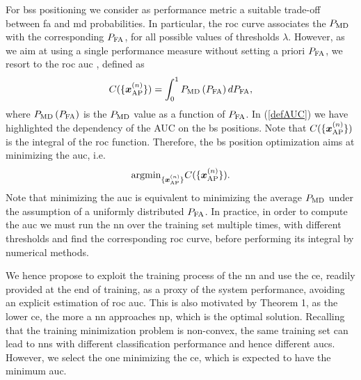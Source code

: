 \documentclass[conference,final]{IEEEtran}
\begin{document}
For  \acp{bs} positioning we consider as performance metric a suitable trade-off between \ac{fa} and \ac{md} probabilities. In particular, the \ac{roc} curve associates the $P_{\rm MD}$ with the corresponding $P_{\rm FA}$, for all possible values of thresholds $\lambda$. However, as we aim at using a single performance measure without setting a priori  $P_{\rm FA}$, we  resort to the \ac{roc} \ac{auc} \cite{hanley-82}, defined as 
\begin{equation}
    C(\{\bm{x}_{\rm AP}^{(n)}\})  = \int_{0}^{1} P_{\rm MD}\left(P_{\rm FA}\right) d P_{\rm FA},
    \label{defAUC}
\end{equation}
where $P_{\rm MD}\left(P_{\rm FA}\right)$ is the $P_{\rm MD}$ value as a function of $P_{\rm FA}$. In (\ref{defAUC}) we have highlighted the dependency of the AUC on the \ac{bs} positions. Note that  $C(\{\bm{x}_{\rm AP}^{(n)}\})  $ is  the integral of the \ac{roc} function. Therefore, the \ac{bs} position optimization aims at minimizing the \ac{auc}, i.e.
\begin{equation}
    {\rm argmin}_{\{\bm{x}_{\rm AP}^{(n)}\}} C(\{\bm{x}_{\rm AP}^{(n)}\}). 
    \label{defoptpos}
\end{equation}
Note that minimizing the \ac{auc} is equivalent to minimizing the average $P_{\rm MD}$ under the assumption of a  uniformly distributed $P_{\rm FA}$.
In practice, in order to compute the \ac{auc} we must run the \ac{nn} over the training set  multiple times, with different thresholds and find the corresponding \ac{roc} curve, before performing its integral by numerical methods.

We hence propose to exploit the training process of the \ac{nn} and use the \ac{ce}, readily provided at the end of training, as a proxy of the system performance, avoiding an explicit estimation of  \ac{roc}  \ac{auc}. This is also motivated by Theorem 1, as the lower \ac{ce}, the more a \ac{nn} approaches \ac{np}, which is the optimal solution. 
Recalling that the training minimization problem is non-convex, the same training set can lead to \acp{nn} with different classification performance and hence different \acp{auc}. However, we select the one minimizing the   \ac{ce}, which is expected to have the minimum \ac{auc}.
\end{document}
